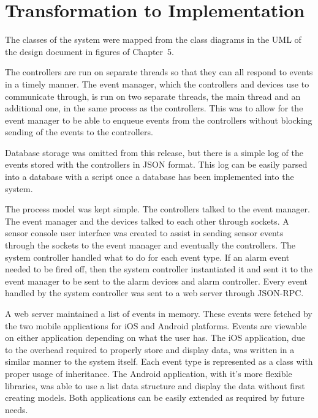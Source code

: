 \documentclass{article}
\begin{document}
\section{Transformation to Implementation} %

The classes of the system were mapped from the class diagrams in the UML of the
design document in figures of Chapter~5. 

The controllers are run on separate threads so that they can all respond to
events in a timely manner. The event manager, which the controllers and devices
use to communicate through, is run on two separate threads, the main thread and
an additional one, in the same process as the controllers. This was to allow
for the event manager to be able to enqueue events from the controllers without
blocking sending of the events to the controllers.

Database storage was omitted from this release, but there is a simple log of
the events stored with the controllers in JSON format. This log can be easily
parsed into a database with a script once a database has been implemented into
the system.

The process model was kept simple. The controllers talked to the event manager.
The event manager and the devices talked to each other through sockets. A
sensor console user interface was created to assist in sending sensor events
through the sockets to the event manager and eventually the controllers. The
system controller handled what to do for each event type. If an alarm event
needed to be fired off, then the system controller instantiated it and sent it
to the event manager to be sent to the alarm devices and alarm controller.
Every event handled by the system controller was sent to a web server through
JSON-RPC. 

A web server maintained a list of events in memory. These events were fetched
by the two mobile applications for iOS and Android platforms. Events are
viewable on either application depending on what the user has. The iOS
application, due to the overhead required to properly store and display data,
was written in a similar manner to the system itself. Each event type is
represented as a class with proper usage of inheritance. The Android
application, with it's more flexible libraries, was able to use a list data
structure and display the data without first creating models. Both applications
can be easily extended as required by future needs.
\end{document}
